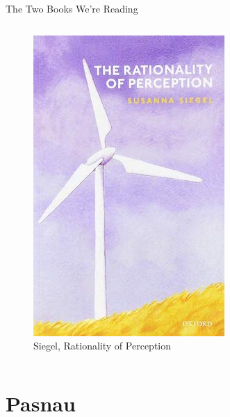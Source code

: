 \documentclass[
  17pt,
  letterpaper,
  ignorenonframetext,
  aspectratio=169,
  handout]{beamer}
\begin{document}
\begin{frame}{The Two Books We're Reading}
\begin{columns}[T]
\begin{column}{0.48\textwidth}
\begin{figure}
{\centering \includegraphics[width=\textwidth,height=0.6\textheight]{../images/siegel_cover.jpeg}

}

\caption{Siegel, Rationality of Perception}

\end{figure}
\end{column}
\end{columns}
\end{frame}

\hypertarget{pasnau}{%
\section{Pasnau}\label{pasnau}}
\end{document}
